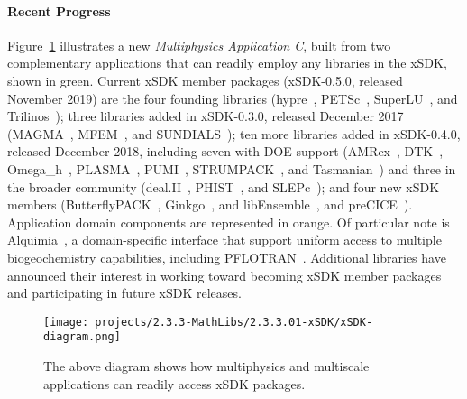 \paragraph{Recent Progress}

Figure~\ref{fig:xsdk-schematic} illustrates a new {\em Multiphysics
	Application C}, built from two complementary applications that can
readily employ any libraries in the xSDK, shown in green.  Current xSDK member packages (xSDK-0.5.0, released November 2019) are the four founding libraries
(hypre~\cite{hypre:homepage}, PETSc~\cite{petsc:homepage}, SuperLU~\cite{superlu:homepage}, and Trilinos~\cite{trilinos:homepage}); three libraries added in xSDK-0.3.0, released December 2017 (MAGMA~\cite{magma:homepage}, MFEM~\cite{mfem:homepage}, and SUNDIALS~\cite{sundials:homepage}); ten more libraries added in xSDK-0.4.0, released December 2018, including seven with DOE support (AMRex~\cite{amrex:homepage}, DTK~\cite{dtk:homepage}, Omega\_h~\cite{omega_h:homepage}, PLASMA~\cite{plasma:homepage}, PUMI~\cite{pumi:homepage}, STRUMPACK~\cite{strumpack:homepage}, and Tasmanian~\cite{tasmanian:homepage}) and three in the broader community (deal.II~\cite{deal.ii:homepage}, PHIST~\cite{phist:homepage}, and SLEPc~\cite{slepc:homepage}); and four new xSDK members (ButterflyPACK~\cite{butterflypack:homepage}, 
Ginkgo~\cite{ginkgo:homepage}, and libEnsemble~\cite{libensemble:homepage}, and preCICE~\cite{precice:homepage}).
Application domain components are represented
in orange.  Of particular note is Alquimia~\cite{alquimia:homepage}, a domain-specific interface
that support uniform access to multiple biogeochemistry capabilities, including
PFLOTRAN~\cite{pflotran:homepage}.  Additional libraries have announced their interest in working toward becoming xSDK member packages and participating in future xSDK releases.
\begin{figure}[htb]
	\centering
	\texttt{[image: projects/2.3.3-MathLibs/2.3.3.01-xSDK/xSDK-diagram.png]}
	\caption{\label{fig:xsdk-schematic} The above diagram shows how multiphysics and multiscale applications can readily access xSDK packages.}
\end{figure}

